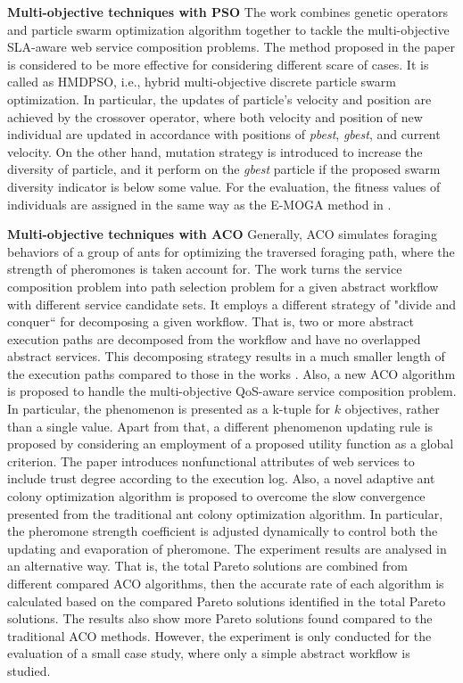 \textbf{Multi-objective techniques with PSO} The work \cite{yin2014hybrid} combines genetic operators and particle swarm optimization algorithm together to tackle the multi-objective SLA-aware web service composition problems. The method proposed in the paper  is considered to be more effective for  considering different scare of cases.  It is called as HMDPSO, i.e., hybrid multi-objective discrete particle swarm optimization. In particular, the updates of particle's velocity and position are achieved by the crossover operator, where both velocity and position of new individual are updated in accordance with positions of \textit{pbest}, \textit{gbest}, and current velocity. On the other hand, mutation strategy is introduced to increase the diversity of particle, and it perform on the \textit{gbest} particle if the proposed swarm diversity indicator is below some value. For the evaluation,  the fitness values of individuals are assigned in the same way as the E-MOGA method in \cite{wada2012e3}.

\textbf{Multi-objective techniques with ACO} Generally, ACO simulates foraging behaviors of a group of ants for optimizing the traversed foraging path, where the strength of pheromones is taken account for. The work \cite{zhang2010qos} turns the service composition problem into path selection problem for a given abstract workflow with different service candidate sets. It employs a different strategy of "divide and conquer`` for decomposing a given workflow. That is,  two or more abstract execution paths are decomposed from the workflow and have no overlapped abstract services. This decomposing strategy results in a much smaller length of the execution paths compared to those in the works \cite{yu2007efficient}.  Also, a new ACO algorithm is proposed to handle the multi-objective QoS-aware service composition problem. In particular,  the phenomenon is presented as a k-tuple for $k$ objectives, rather than a single value. Apart from that, a different phenomenon updating rule is proposed by considering an employment of a proposed utility function as a global criterion. The paper \cite{wang2014novel} introduces nonfunctional attributes of web services to include trust degree according to the execution log. Also, a novel adaptive ant colony optimization algorithm is proposed to overcome the slow convergence presented from the traditional ant colony optimization algorithm. In particular, the pheromone strength coefficient is adjusted dynamically to control both the updating and evaporation of pheromone. The experiment results are analysed in an alternative way. That is, the total Pareto solutions are combined from different compared ACO algorithms, then the accurate rate of each algorithm is calculated based on the compared Pareto solutions identified in the total Pareto solutions. The results also show more Pareto solutions found compared to the traditional ACO methods. However, the experiment is only conducted for the evaluation of a small case study, where only a simple abstract workflow is studied.

